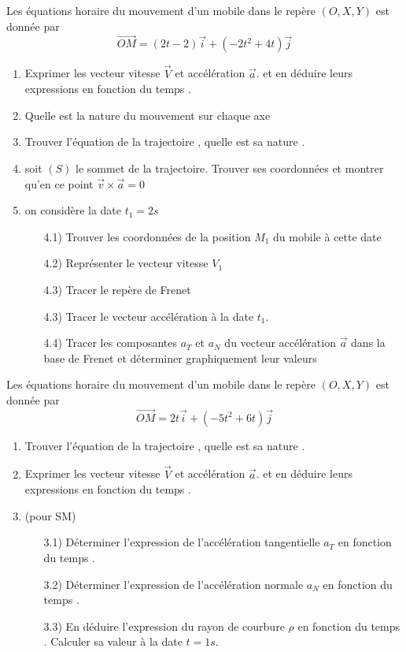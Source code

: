 \documentclass[10pt,a4paper]{article}
\begin{document}
\begin{tcolorbox}[sabour,title=EXERCICE 7]
Les équations horaire du mouvement d'un mobile dans le repère $(O,X,Y) $ est donnée par 
$$\vec{OM}=
(2t-2) \vec{i}+(-2t^2 + 4t)\vec{j}$$
\begin{enumerate}
\item  Exprimer les vecteur vitesse $\vec{V}$ et accélération $\vec{a}$. et en déduire leurs expressions en fonction du temps .
\item Quelle est la nature du mouvement sur chaque axe
\item Trouver l'équation de la trajectoire , quelle est sa nature .
\item soit $(S)$ le sommet de la trajectoire. Trouver ses coordonnées et montrer qu'en ce point $\vec{v}\times\vec{a}=0$ 
\item on considère la date $t_1=2 s$ 
\begin{enumerate}
\item[4.1)] Trouver les coordonnées de la position $M_1$ du mobile à cette date
\item[4.2)] Représenter le vecteur vitesse $V_1$
\item[4.3)] Tracer le repère de Frenet 
\item[4.3)] Tracer le vecteur accélération à la date $t_1$.
\item[4.4)] Tracer les composantes $a_T$ et $a_N$ du vecteur accélération $\vec{a}$ dans la base de Frenet et déterminer graphiquement leur valeurs 

\end{enumerate}
\end{enumerate}
\end{tcolorbox}


\begin{tcolorbox}[sabour,title=EXERCICE 8]
Les équations horaire du mouvement d'un mobile dans le repère $(O,X,Y) $ est donnée par 
$$\vec{OM}=
2t \vec{i}+(-5t^2 + 6t)\vec{j}$$
\begin{enumerate}


\item Trouver l'équation de la trajectoire , quelle est sa nature .
\item  Exprimer les vecteur vitesse $\vec{V}$ et accélération $\vec{a}$. et en déduire leurs expressions en fonction du temps .
\item (pour SM) 
\begin{enumerate}
\item[3.1)]Déterminer l'expression de l'accélération tangentielle $a_T$  en fonction du temps .
\item[3.2)] Déterminer l'expression de l'accélération normale $a_N$ en fonction du temps .
\item[3.3)] En déduire l'expression du rayon de courbure $\rho$ en fonction du temps . Calculer sa valeur à la date $t=1s$.
\end{enumerate}
\end{enumerate}
\end{tcolorbox}
\end{document}
